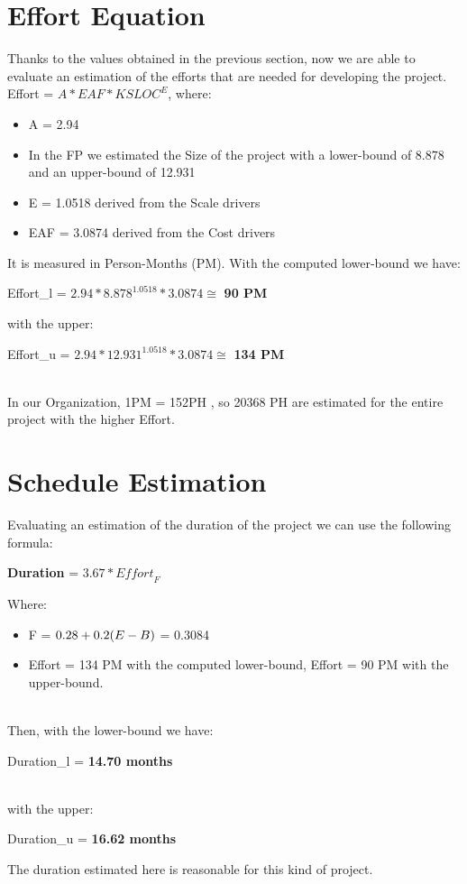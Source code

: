 \section{Effort Equation}
Thanks to the values obtained in the previous section, now we are able to evaluate an estimation of the efforts that are needed for developing the project.  Effort = $A * EAF * KSLOC^E $, where:  
\begin{itemize}
\item A = 2.94 
\item In the FP we estimated the Size of the project with a lower-bound of 8.878 and an upper-bound of 12.931
\item E = 1.0518 derived from the Scale drivers
\item EAF = 3.0874 derived from the Cost drivers
\end{itemize}
It is measured in Person-Months (PM).
With the computed lower-bound we have: 
\\\begin{center} Effort_l = $2.94 * 8.878^{1.0518} * 3.0874 \cong$ \textbf{90 PM}\end{center}
with the upper:
\\\begin{center} Effort_u = $2.94 * 12.931^{1.0518} * 3.0874 \cong$ \textbf{134 PM} \end{center}

\\In our Organization, 1PM = 152PH , so 20368 PH are estimated for the entire project with the higher Effort.

\section{Schedule Estimation}
Evaluating an estimation of the duration of the project we can use the following formula:
\begin{center}\textbf{Duration} = $3.67 * \textit{Effort}_F$  \end{center}
Where:
\begin{itemize}
\item F = $0.28 + 0.2 \* (E - B)$ = 0.3084
\item Effort = 134 PM with the computed lower-bound, Effort = 90 PM with the upper-bound.
\end{itemize}
\\Then, with the lower-bound we have: 
\begin{center}Duration_l = \textbf{14.70 months} \end{center}
\\with the upper:
\begin{center}Duration_u = \textbf{16.62 months} \end{center}
The duration estimated here is reasonable for this kind of project.

